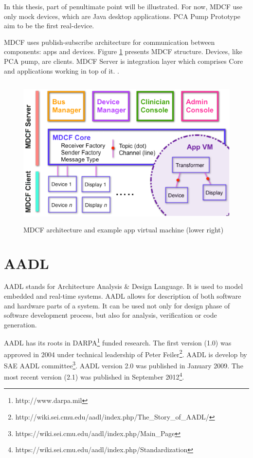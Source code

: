 In this thesis, part of penultimate point will be illustrated. For now, MDCF use only mock devices, which are Java desktop applications. PCA Pump Prototype aim to be the first real-device.

MDCF uses publish-subscribe architecture for communication between components: apps and devices. Figure \ref{figure:mdcf} presents MDCF structure. Devices, like PCA pump, are clients. MDCF Server is integration layer which comprises Core and applications working in top of it. \cite{MDCF:Paper}.

\begin{figure}[ht]%
    \begin{center}
    	\includegraphics[height=3in]{figures/mdcf.png}    	
    \end{center}
    \caption{MDCF architecture and example app virtual machine (lower right)}
    \label{figure:mdcf}
\end{figure}



\section{AADL}
\label{background:aadl}

AADL stands for Architecture Analysis \& Design Language. It is used to model embedded and real-time systems. AADL allows for description of both software and hardware parts of a system. It can be used not only for design phase of software development process, but also for analysis, verification or code generation.

AADL has its roots in DARPA\footnote{http://www.darpa.mil} funded research. The first version (1.0) was approved in 2004 under technical leadership of Peter Feiler\footnote{http://wiki.sei.cmu.edu/aadl/index.php/The\_Story\_of\_AADL/}. AADL is develop by SAE AADL committee\footnote{https://wiki.sei.cmu.edu/aadl/index.php/Main\_Page}. AADL version 2.0 was published in January 2009. The most recent version (2.1) was published in September 2012\footnote{https://wiki.sei.cmu.edu/aadl/index.php/Standardization}.

